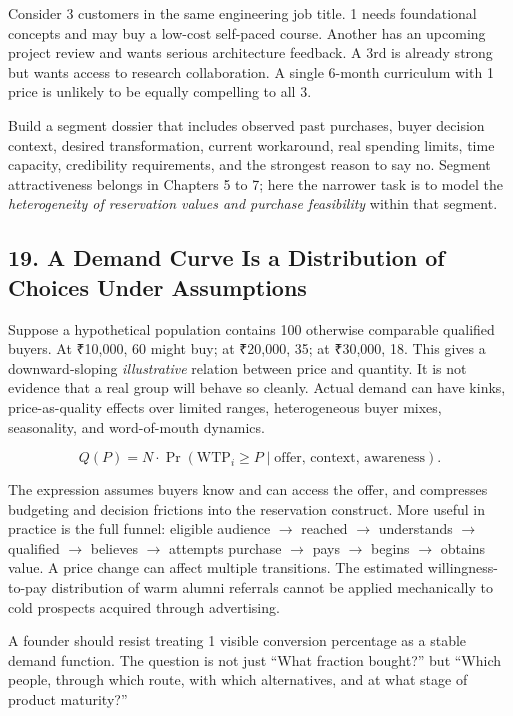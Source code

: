 Consider 3 customers in the same engineering job title. 1 needs foundational concepts and may buy a low-cost self-paced course. Another has an upcoming project review and wants serious architecture feedback. A 3rd is already strong but wants access to research collaboration. A single 6-month curriculum with 1 price is unlikely to be equally compelling to all 3.

Build a segment dossier that includes observed past purchases, buyer decision context, desired transformation, current workaround, real spending limits, time capacity, credibility requirements, and the strongest reason to say no. Segment attractiveness belongs in Chapters 5 to 7; here the narrower task is to model the \emph{heterogeneity of reservation values and purchase feasibility} within that segment.

\subsection*{19. A Demand Curve Is a Distribution of Choices Under Assumptions}

Suppose a hypothetical population contains 100 otherwise comparable qualified buyers. At ₹10,000, 60 might buy; at ₹20,000, 35; at ₹30,000, 18. This gives a downward-sloping \emph{illustrative} relation between price and quantity. It is not evidence that a real group will behave so cleanly. Actual demand can have kinks, price-as-quality effects over limited ranges, heterogeneous buyer mixes, seasonality, and word-of-mouth dynamics.

\begin{equation}
Q(P) = N \cdot \Pr(\text{WTP}_i \ge P \mid \text{offer, context, awareness}).
\end{equation}

The expression assumes buyers know and can access the offer, and compresses budgeting and decision frictions into the reservation construct. More useful in practice is the full funnel: eligible audience $\rightarrow$ reached $\rightarrow$ understands $\rightarrow$ qualified $\rightarrow$ believes $\rightarrow$ attempts purchase $\rightarrow$ pays $\rightarrow$ begins $\rightarrow$ obtains value. A price change can affect multiple transitions. The estimated willingness-to-pay distribution of warm alumni referrals cannot be applied mechanically to cold prospects acquired through advertising.

A founder should resist treating 1 visible conversion percentage as a stable demand function. The question is not just ``What fraction bought?'' but ``Which people, through which route, with which alternatives, and at what stage of product maturity?''

